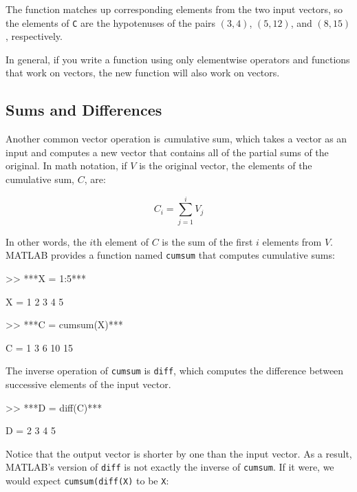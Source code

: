 The function matches up corresponding elements from the two
input vectors, so the elements of {\tt C} are the hypotenuses of
the pairs $(3,4)$, $(5,12)$, and $(8,15)$, respectively.

In general, if you write a function using only elementwise
operators and functions that work on vectors, the new
function will also work on vectors.


\subsection{Sums and Differences}

Another common vector operation is {\emph cumulative sum}, which takes a vector as an input and computes a new vector that contains all of the partial sums of the original.  In math notation, if $V$ is the original vector, the elements of the cumulative sum, $C$, are:


\begin{equation}
C_i = \sum_{j=1}^i V_j
\end{equation}

In other words, the $i$th element of $C$ is the sum of the first
$i$ elements from $V$.  MATLAB provides a function named {\tt cumsum} that computes cumulative sums:


\begin{code}
>> ***X = 1:5***

X = 1     2     3     4     5

>> ***C = cumsum(X)***

C = 1     3     6    10    15
\end{code}

The inverse operation of {\tt cumsum} is {\tt diff}, which computes
the difference between successive elements of the input vector.


\begin{code}
>> ***D = diff(C)***

D = 2     3     4     5
\end{code}

Notice that the output vector is shorter by one than the input
vector.  As a result, MATLAB's version of {\tt diff} is not
exactly the inverse of {\tt cumsum}.  If it were, we would
expect {\tt cumsum(diff(X)} to be {\tt X}:


